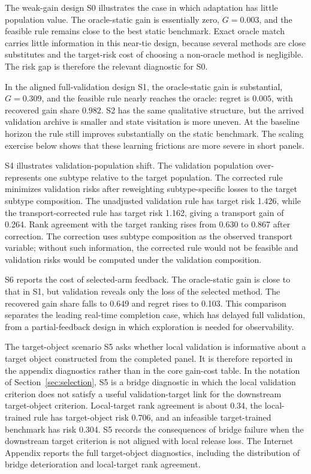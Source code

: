 \documentclass[a4paper, 12pt]{article}
\theoremstyle{plain}
\theoremstyle{remark}
\newcommand{\1}{\mathbf{1}}
\begin{document}


The weak-gain design S0 illustrates the case in which adaptation has little population value. The oracle-static gain is essentially zero, \(G=0.003\), and the feasible rule remains close to the best static benchmark. Exact oracle match carries little information in this near-tie design, because several methods are close substitutes and the target-risk cost of choosing a non-oracle method is negligible. The risk gap is therefore the relevant diagnostic for S0.

In the aligned full-validation design S1, the oracle-static gain is substantial, \(G=0.309\), and the feasible rule nearly reaches the oracle: regret is \(0.005\), with recovered gain share \(0.982\). S2 has the same qualitative structure, but the arrived validation archive is smaller and state visitation is more uneven. At the baseline horizon the rule still improves substantially on the static benchmark. The scaling exercise below shows that these learning frictions are more severe in short panels.

S4 illustrates validation-population shift. The validation population over-represents one subtype relative to the target population. The corrected rule minimizes validation risks after reweighting subtype-specific losses to the target subtype composition. The unadjusted validation rule has target risk 1.426, while the transport-corrected rule has target risk 1.162, giving a transport gain of 0.264. Rank agreement with the target ranking rises from 0.630 to 0.867 after correction. The correction uses subtype composition as the observed transport variable; without such information, the corrected rule would not be feasible and validation risks would be computed under the validation composition.

S6 reports the cost of selected-arm feedback. The oracle-static gain is close to that in S1, but validation reveals only the loss of the selected method. The recovered gain share falls to 0.649 and regret rises to 0.103. This comparison separates the leading real-time completion case, which has delayed full validation, from a partial-feedback design in which exploration is needed for observability.

The target-object scenario S5 asks whether local validation is informative about a target object constructed from the completed panel. It is therefore reported in the appendix diagnostics rather than in the core gain-cost table. In the notation of Section~\ref{sec:selection}, S5 is a bridge diagnostic in which the local validation criterion does not satisfy a useful validation-target link for the downstream target-object criterion. Local-target rank agreement is about 0.34, the local-trained rule has target-object risk 0.706, and an infeasible target-trained benchmark has risk 0.304. S5 records the consequences of bridge failure when the downstream target criterion is not aligned with local release loss. The Internet Appendix reports the full target-object diagnostics, including the distribution of bridge deterioration and local-target rank agreement.
\end{document}
